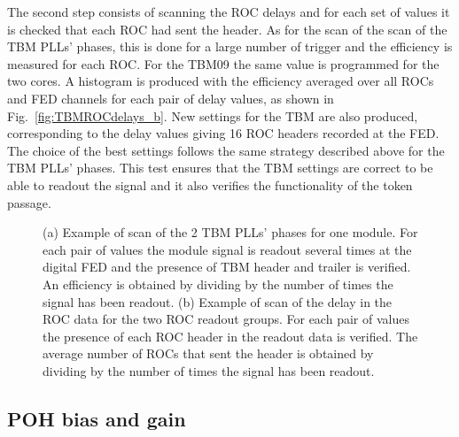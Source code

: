 The second step consists of scanning the ROC delays and for each set of values it is checked that each ROC had sent the header.
As for the scan of the scan of the TBM PLLs' phases, this is done for a large number of trigger and the efficiency is measured for each ROC.
For the TBM09 the same value is programmed for the two cores.
A histogram is produced with the efficiency averaged over all ROCs and FED channels for each pair of delay values, as shown in Fig.~\ref{fig:TBMROCdelays_b}.
New settings for the TBM are also produced, corresponding to the delay values giving 16 ROC headers recorded at the FED.
The choice of the best settings follows the same strategy described above for the TBM PLLs' phases.
This test ensures that the TBM settings are correct to be able to readout the signal and it also verifies the functionality of the token passage.

\begin{figure}[!htb]
 \begin{center}
 \end{center}
 \caption{(a) Example of scan of the 2 TBM PLLs' phases for one module. For each pair of values the module signal is readout several times at the digital FED and the presence of TBM header and trailer is verified.
 An efficiency is obtained by dividing by the number of times the signal has been readout.
 (b) Example of scan of the delay in the ROC data for the two ROC readout groups. For each pair of values the presence of each ROC header in the readout data is verified. The average number of ROCs that sent the header is obtained by dividing by the number of times the signal has been readout.}
 \label{fig:TBMROCdelays}
\end{figure} 

\subsection{POH bias and gain}

